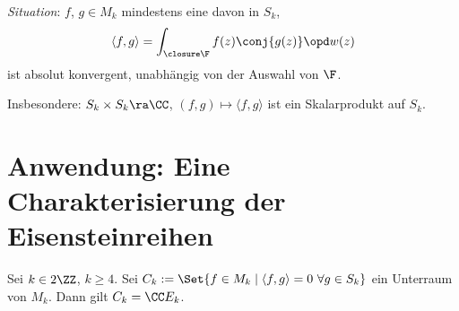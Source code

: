 \emph{Situation}: $f$, $g \in M_k$ mindestens eine davon in $S_k$,
\[
	\langle f,g \rangle = \int_{\closure \F} f(z) \conj{g(z)} \opd w(z)
\]
ist absolut konvergent, unabhängig von der Auswahl von $\F$.

Insbesondere: $S_k \times S_k \ra \CC$, $(f,g) \mapsto \langle f,g\rangle$ ist ein Skalarprodukt auf $S_k$.

\section{Anwendung: Eine Charakterisierung der Eisensteinreihen}

\begin{satz}
	Sei $k \in 2\ZZ$, $k \geq 4$. Sei $C_k := \Set{f \in M_k \mid \langle f,g\rangle = 0 \ \forall g \in S_k}$ ein Unterraum von $M_k$.
	Dann gilt $C_k = \CC E_k$.
\end{satz}


